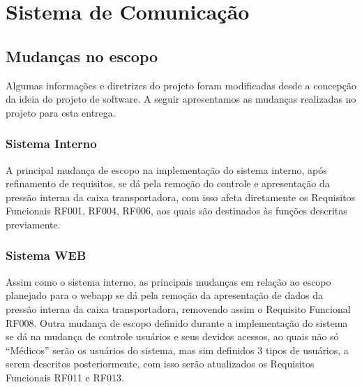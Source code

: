 \section{Sistema de Comunicação}

\subsection{Mudanças no escopo}
	Algumas informações e diretrizes do projeto foram modificadas desde a concepção da ideia do projeto de software. A seguir apresentamos as mudanças realizadas no projeto para esta entrega.

\subsubsection{Sistema Interno}
	A principal mudança de escopo na implementação do sistema interno, após refinamento de requisitos, se dá pela remoção do controle e apresentação da pressão interna da caixa transportadora, com isso afeta diretamente os Requisitos Funcionais RF001, RF004, RF006, aos quais são destinados às funções descritas previamente.

\subsubsection{Sistema WEB}
	Assim como o sistema interno, as principais mudanças em relação ao escopo planejado para o webapp se dá pela remoção da apresentação de dados da pressão interna da caixa transportadora, removendo assim o Requisito Funcional RF008.
	Outra mudança de escopo definido durante a implementação do sistema se dá na mudança de controle usuários e seus devidos acessos, ao quais não só “Médicos” serão os usuários do sistema, mas sim definidos 3 tipos de usuários, a serem descritos posteriormente, com isso serão atualizados os Requisitos Funcionais RF011 e RF013.

